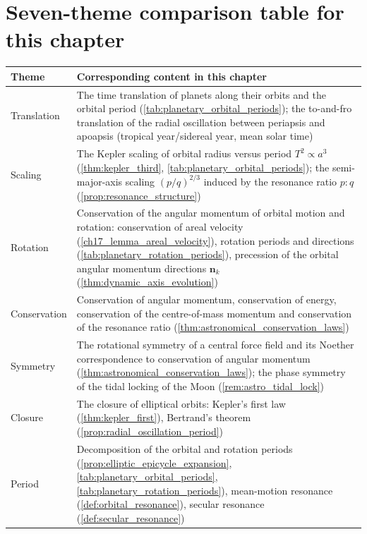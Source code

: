 \section*{Seven-theme comparison table for this chapter}
\begin{center}
\begin{tabular}{>{\centering\arraybackslash}p{2.8cm}>{\centering\arraybackslash}p{8.9cm}}
\toprule
Theme & Corresponding content in this chapter \\
\midrule
Translation & The time translation of planets along their orbits and the orbital period (\cref{tab:planetary_orbital_periods}); the to-and-fro translation of the radial oscillation between periapsis and apoapsis (tropical year/sidereal year, mean solar time) \\
Scaling & The Kepler scaling of orbital radius versus period \(T^2\propto a^3\) (\cref{thm:kepler_third}, \cref{tab:planetary_orbital_periods}); the semi-major-axis scaling \((p/q)^{2/3}\) induced by the resonance ratio \(p:q\) (\cref{prop:resonance_structure}) \\
Rotation & Conservation of the angular momentum of orbital motion and rotation: conservation of areal velocity (\cref{ch17_lemma_areal_velocity}), rotation periods and directions (\cref{tab:planetary_rotation_periods}), precession of the orbital angular momentum directions \(\mathbf n_k\) (\cref{thm:dynamic_axis_evolution}) \\
Conservation & Conservation of angular momentum, conservation of energy, conservation of the centre-of-mass momentum and conservation of the resonance ratio (\cref{thm:astronomical_conservation_laws}) \\
Symmetry & The rotational symmetry of a central force field and its Noether correspondence to conservation of angular momentum (\cref{thm:astronomical_conservation_laws}); the phase symmetry of the tidal locking of the Moon (\cref{rem:astro_tidal_lock}) \\
Closure & The closure of elliptical orbits: Kepler's first law (\cref{thm:kepler_first}), Bertrand's theorem (\cref{prop:radial_oscillation_period}) \\
Period & Decomposition of the orbital and rotation periods (\cref{prop:elliptic_epicycle_expansion}, \cref{tab:planetary_orbital_periods}, \cref{tab:planetary_rotation_periods}), mean-motion resonance (\cref{def:orbital_resonance}), secular resonance (\cref{def:secular_resonance}) \\
\bottomrule
\end{tabular}
\end{center}

